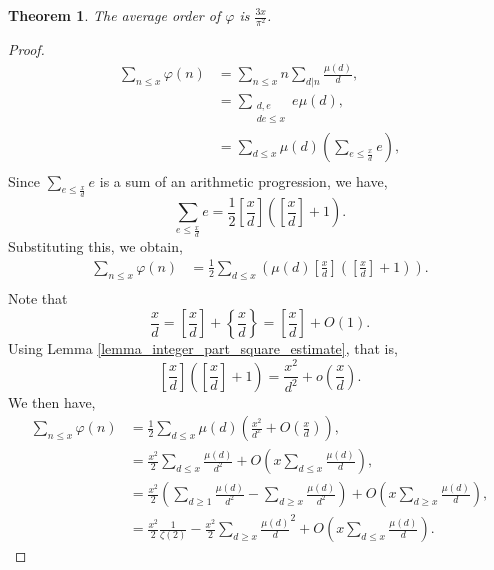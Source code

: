 \documentclass{article}
\newtheorem{theorem}{Theorem} [section]
\begin{document}
\begin{theorem}
  The average order of $\varphi$ is ${\frac {3x} {\pi^2}}$.
\end{theorem}
\begin{proof}

\begin{align*}
  \sum_{n\leq x} \varphi(n) &= \sum_{n\leq x}n\sum_{d|n}{\frac {\mu(d)} d},\\
  & = \sum_{\substack{d,e\\ de \leq x}}e\mu(d),\\
  & = \sum_{d\leq x} \mu(d)\left(\sum_{e\leq {\frac x d}}e\right),\\
\end{align*}
Since $\sum_{e\leq{\frac x d}}e$ is a sum of an arithmetic progression, we have,
\begin{equation*}
  \sum_{e\leq{\frac x d}}e = {\frac 1 2}\left[{\frac x d}\right]\left(\left[{\frac x d}\right]+1\right).
\end{equation*}
Substituting this, we obtain,
\begin{align*}
  \sum_{n\leq x} \varphi(n)& = {\frac 1 2}\sum_{d\leq x}\left(\mu(d)\left[{\frac x d}\right]\left(\left[{\frac x d}\right]+1\right)\right).\\
\end{align*}
Note that 
\begin{equation*}
  {\frac x d} = \left[{\frac x d}\right] + \left\{{\frac x d}\right\} = \left[{\frac x d}\right] + O(1).
\end{equation*}
Using Lemma \ref{lemma_integer_part_square_estimate}, that is,
\begin{equation*}
  \left[{\frac x d}\right]\left(\left[{\frac x d}\right]+1\right) = {\frac {x^2} {d^2}}+o\left({\frac x d}\right).
\end{equation*}
We then have,
\begin{align*}
  \sum_{n\leq x} \varphi(n)& = {\frac 1 2}\sum_{d\leq x}\mu(d)\left({\frac {x^2} {d^x}}+O\left({\frac x d}\right)\right),\\
  & = {\frac {x^2} 2}\sum_{d\leq x}{\frac {\mu(d)} {d^2}}+O\left(x\sum_{d\leq x}{\frac {\mu(d)} d}\right),\\
  & = {\frac {x^2} 2}\left(\sum_{d\geq 1}{\frac {\mu(d)} {d^2}}-\sum_{d\geq x}{\frac {\mu(d)} {d^2}}\right)+O\left(x\sum_{d\geq x}{{\frac {\mu(d)} d}} \right),\\
  & = {\frac {x^2} 2}{\frac 1 {\zeta(2)}}-  {\frac {x^2} 2}\sum_{d\geq x}{\frac {\mu(d)} d^2}+O\left(x\sum_{d\leq x}{\frac {\mu(d)} d}\right).
\end{align*}

\end{proof}
\end{document}
